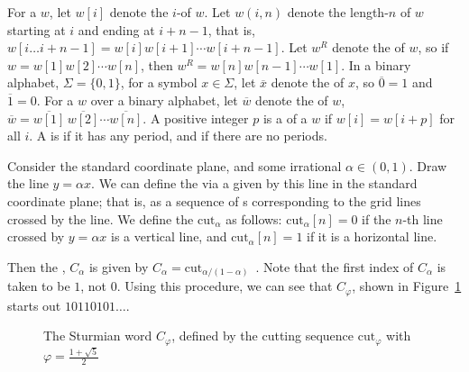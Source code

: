 For a \word $w$, let $w[i]$ denote the $i$- of $w$.
Let $w(i,n)$ denote the length-$n$ \factor of $w$ starting at $i$ and ending at $i + n - 1$, that is, $w[i \ldots i + n - 1] = w[i] w[i + 1] \cdots w[i + n - 1]$.
Let $w^R$ denote the  of $w$, so if $w = w[1] w[2] \cdots w[n]$, then $w^R = w[n] w[n-1] \cdots w[1]$.
In a binary alphabet, $\Sigma = \{0,1\}$, for a symbol $x \in \Sigma$, let $\overline{x}$ denote the  of $x$, so $\overline{0} = 1$ and $\overline{1} = 0$.
For a \word $w$ over a binary alphabet, let $\overline{w}$ denote the  of $w$, $\overline{w} = \overline{w[1]} \, \overline{w[2]} \cdots \overline{w[n]}$.
A positive integer $p$ is a  of a \word $w$ if $w[i] = w[i + p]$ for all $i$.
A \word is  if it has any period, and  if there are no periods.

Consider the standard coordinate plane, and some irrational $\alpha \in (0,1)$.
Draw the line $y = \alpha x$.
We can define the  via a  given by this line in the standard coordinate plane; that is, as a sequence of s corresponding to the grid lines crossed by the line.
We define the \word $\text{cut}_{\alpha}$ as follows:
$\text{cut}_{\alpha}[n] = 0$ if the $n$-th line crossed by $y = \alpha x$ is a vertical line, and $\text{cut}_{\alpha}[n] = 1$ if it is a horizontal line.

Then the , $C_{\alpha}$ is given by $C_{\alpha} = \text{cut}_{\alpha/(1-\alpha)}$~\autocite[Theorem 9.2.1]{auto_seq}.
Note that the first index of $C_{\alpha}$ is taken to be $1$, not $0$.
Using this procedure, we can see that $C_{\varphi}$, shown in Figure~\ref{fig:geom-sturmian-phi} starts out $10110101\ldots$.

\begin{figure}
    \centering
    \caption{The Sturmian word $C_{\varphi}$, defined by the cutting sequence $\text{cut}_{\varphi}$ with $\varphi = \frac{1 + \sqrt{5}}{2}$}
    \label{fig:geom-sturmian-phi}
\end{figure}

